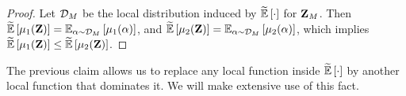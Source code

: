 \begin{proof}
Let ${\mathcal D}_M$ be the local distribution induced by $\tildeEx{\cdot}$ for ${ \mathbf{Z} }_M$. Then
$\tildeEx{\mu_1(\zee)} = \Ex{\alpha \sim \calD_M}{\mu_1(\alpha)}$, and $\tildeEx{\mu_2(\zee)} =
\Ex{\alpha\sim \calD_M}{\mu_2(\alpha)}$, which implies $\tildeEx{\mu_1(\zee)} \leq \tildeEx{\mu_2(\zee)}$.
%
\end{proof}
%
The previous claim allows us to replace any local function inside $\tildeEx{\cdot}$ by another local function that dominates it. We will make extensive use of this fact.
%
%
\vspace{-5 pt}
